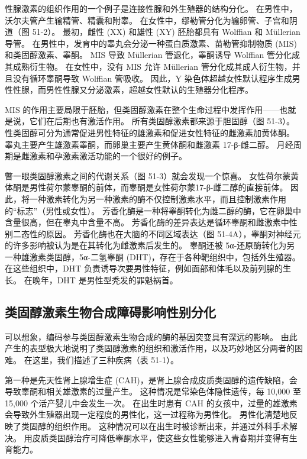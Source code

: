 性腺激素的组织作用的一个例子是连接性腺和外生殖器的结构分化。 在男性中，沃尔夫管产生输精管、精囊和附睾。 在女性中，缪勒管分化为输卵管、子宫和阴道（图 51-2）。 最初，雌性 (XX) 和雄性 (XY) 胚胎都具有 Wolffian 和 Müllerian 导管。 在男性中，发育中的睾丸会分泌一种蛋白质激素、苗勒管抑制物质 (MIS) 和类固醇激素、睾酮。 MIS 导致 Müllerian 管退化，睾酮诱导 Wolffian 管分化成其成熟衍生物。 在女性中，没有 MIS 允许 Müllerian 管分化成其成人衍生物，并且没有循环睾酮导致 Wolffian 管吸收。 因此，Y 染色体超越女性默认程序生成男性性腺，而男性性腺又分泌激素，超越女性默认的生殖器分化程序。

MIS 的作用主要局限于胚胎，但类固醇激素在整个生命过程中发挥作用——也就是说，它们在后期也有激活作用。 所有类固醇激素都来源于胆固醇（图 51-3）。 性类固醇可分为通常促进男性特征的雄激素和促进女性特征的雌激素加黄体酮。 睾丸主要产生雄激素睾酮，而卵巢主要产生黄体酮和雌激素 17-β-雌二醇。 月经周期是雌激素和孕激素激活功能的一个很好的例子。

瞥一眼类固醇激素之间的代谢关系（图 51-3）就会发现一个惊喜。 女性荷尔蒙黄体酮是男性荷尔蒙睾酮的前体，而睾酮是女性荷尔蒙17-β-雌二醇的直接前体。 因此，将一种激素转化为另一种激素的酶不仅控制激素水平，而且控制激素作用的“标志”（男性或女性）。 芳香化酶是一种将睾酮转化为雌二醇的酶，它在卵巢中含量很高，但在睾丸中含量不高。 芳香化酶的差异表达是循环睾酮和雌激素中性别二态性的原因。 芳香化酶也在大脑的不同区域表达（图 51-4A），睾酮对神经元的许多影响被认为是在其转化为雌激素后发生的。 睾酮还被 5α-还原酶转化为另一种雄激素类固醇，5α-二氢睾酮 (DHT)，存在于各种靶组织中，包括外生殖器。 在这些组织中，DHT 负责诱导次要男性特征，例如面部和体毛以及前列腺的生长。 在晚年，DHT 是男性型秃发的罪魁祸首。

\subsection{类固醇激素生物合成障碍影响性别分化}

可以想象，编码参与类固醇激素生物合成的酶的基因突变具有深远的影响。 由此产生的表型极大地说明了类固醇激素的组织和激活作用，以及巧妙地区分两者的困难。 在这里，我们描述了三种疾病（表 51-1）。

第一种是先天性肾上腺增生症 (CAH)，是肾上腺合成皮质类固醇的遗传缺陷，会导致睾酮和相关雄激素的过量产生。 这种情况是常染色体隐性遗传，每 10,000 至 15,000 个活产婴儿中会发生一次。 在出生时患有 CAH 的女孩中，过量的雄激素会导致外生殖器出现一定程度的男性化，这一过程称为男性化。 男性化清楚地反映了类固醇的组织作用。 这种情况可以在出生时被诊断出来，并通过外科手术解决。 用皮质类固醇治疗可降低睾酮水平，使这些女性能够进入青春期并变得有生育能力。

